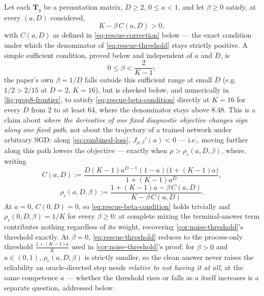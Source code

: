 \begin{proposition}
\label{prop:outcome-rescue}
Let each $\bm{T}_g$ be a permutation matrix, $D\ge2$, $0\le a<1$, and let
$\beta\ge0$ satisfy, at every $(a,D)$ considered,
\begin{equation}
 K-\beta\, C(a,D)>0,
 \label{eq:rescue-beta-condition}
\end{equation}
with $C(a,D)$ as defined in \cref{eq:rescue-correction} below --- the exact
condition under which the denominator of \cref{eq:rescue-threshold} stays
strictly positive. A simple sufficient condition, proved below and
independent of $a$ and $D$, is
\begin{equation}
 0\le\beta<\frac{2}{K-1};
 \label{eq:rescue-beta-sufficient}
\end{equation}
the paper's own $\beta=1/D$ falls outside this sufficient range at small
$D$ (e.g.\ $1/2>2/15$ at $D=2$, $K=16$), but is checked below, and
numerically in \cref{fig:prop8-frontier}, to satisfy
\cref{eq:rescue-beta-condition} directly at $K=16$ for every $D$ from $2$
to at least $64$, where the denominator stays above $8.48$. This is a
claim about \emph{where the derivative of one fixed diagnostic objective
changes sign along one fixed path}, not about the trajectory of a trained
network under arbitrary SGD: along \cref{eq:combined-loss},
$J_{\rho,\beta}'(a)<0$ --- i.e., moving further along this path lowers the
objective --- exactly when $\rho>\rho_c(a,D,\beta)$, where, writing
\begin{equation}
 C(a,D):=\frac{D(K-1)a^{D-1}(1-a)\bigl(1+(K-1)a\bigr)}{1+(K-1)a^D},
 \label{eq:rescue-correction}
\end{equation}
\begin{equation}
 \rho_c(a,D,\beta):=\frac{1+(K-1)a-\beta\, C(a,D)}{K-\beta\, C(a,D)}.
 \label{eq:rescue-threshold}
\end{equation}
At $a=0$, $C(0,D)=0$, so \cref{eq:rescue-beta-condition} holds trivially
and $\rho_c(0,D,\beta)=1/K$ for every $\beta\ge0$: at complete mixing the
terminal-answer term contributes nothing regardless of its weight,
recovering \cref{cor:noise-threshold}'s threshold exactly. At $\beta=0$,
\cref{eq:rescue-threshold} reduces to the process-only threshold
$\frac{1+(K-1)a}{K}$ used in \cref{cor:noise-threshold}'s proof; for
$\beta>0$ and $a\in(0,1)$, $\rho_c(a,D,\beta)$ is strictly smaller, so the
clean answer never raises the reliability an oracle-directed step needs
\emph{relative to not having it at all}, at the same competence $a$ ---
whether the threshold rises or falls as $a$ itself increases is a separate
question, addressed below.
\end{proposition}
